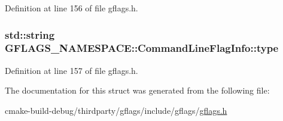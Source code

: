 Definition at line 156 of file gflags.\+h.

\subsubsection[{\texorpdfstring{type}{type}}]{\setlength{\rightskip}{0pt plus 5cm}std\+::string G\+F\+L\+A\+G\+S\+\_\+\+N\+A\+M\+E\+S\+P\+A\+C\+E\+::\+Command\+Line\+Flag\+Info\+::type}\hypertarget{structGFLAGS__NAMESPACE_1_1CommandLineFlagInfo_a04f02cad9caae94a7ffd88e9cb89585b}{}\label{structGFLAGS__NAMESPACE_1_1CommandLineFlagInfo_a04f02cad9caae94a7ffd88e9cb89585b}


Definition at line 157 of file gflags.\+h.



The documentation for this struct was generated from the following file\+:\begin{DoxyCompactItemize}
\item 
cmake-\/build-\/debug/thirdparty/gflags/include/gflags/\hyperlink{gflags_8h}{gflags.\+h}\end{DoxyCompactItemize}
